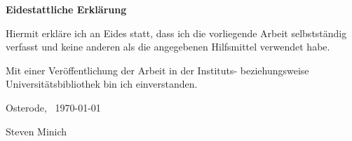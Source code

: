 \makeatletter

\cleardoublepage

\thispagestyle{empty}
\hskip 0mm
\vfill

\begin{center}
    \sffamily\bfseries\large Eidestattliche Erklärung
\end{center}

\bigskip\noindent Hiermit erkläre ich an Eides statt, dass ich die vorliegende Arbeit selbstständig verfasst und keine anderen als die angegebenen Hilfsmittel verwendet habe.\par
Mit einer Veröffentlichung der Arbeit in der Instituts- beziehungsweise Universitätsbibliothek bin ich einverstanden.\par

\bigskip\noindent Osterode,~ \today\par
\vskip 10mm
\hfill \hrulefill\par
\hfill Steven Minich
\makeatother